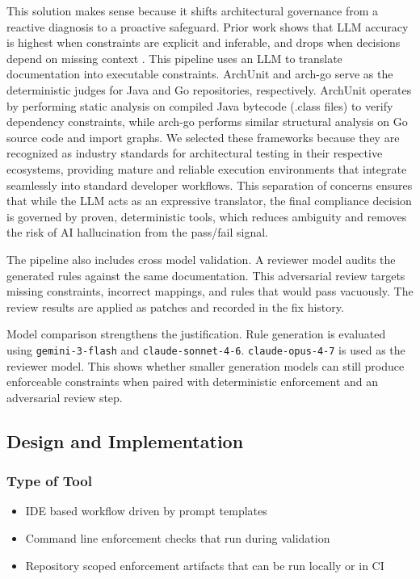 \documentclass[sigconf,screen]{acmart}
\begin{document}
This solution makes sense because it shifts architectural governance from a reactive diagnosis to a proactive safeguard. Prior work shows that LLM accuracy is highest when constraints are explicit and inferable, and drops when decisions depend on missing context \cite{su2026evaluating}. This pipeline uses an LLM to translate documentation into executable constraints. ArchUnit and arch-go serve as the deterministic judges for Java and Go repositories, respectively. ArchUnit operates by performing static analysis on compiled Java bytecode (.class files) to verify dependency constraints, while arch-go performs similar structural analysis on Go source code and import graphs. We selected these frameworks because they are recognized as industry standards for architectural testing in their respective ecosystems, providing mature and reliable execution environments that integrate seamlessly into standard developer workflows. This separation of concerns ensures that while the LLM acts as an expressive translator, the final compliance decision is governed by proven, deterministic tools, which reduces ambiguity and removes the risk of AI hallucination from the pass/fail signal.

The pipeline also includes cross model validation. A reviewer model audits the generated rules against the same documentation. This adversarial review targets missing constraints, incorrect mappings, and rules that would pass vacuously. The review results are applied as patches and recorded in the fix history.

Model comparison strengthens the justification. Rule generation is evaluated using \texttt{gemini-3-flash} and \texttt{claude-sonnet-4-6}. \texttt{claude-opus-4-7} is used as the reviewer model. This shows whether smaller generation models can still produce enforceable constraints when paired with deterministic enforcement and an adversarial review step.

\subsection{Design and Implementation}
\subsubsection{Type of Tool}
\begin{itemize}
    \item IDE based workflow driven by prompt templates
    \item Command line enforcement checks that run during validation
    \item Repository scoped enforcement artifacts that can be run locally or in CI
\end{itemize}
\end{document}
